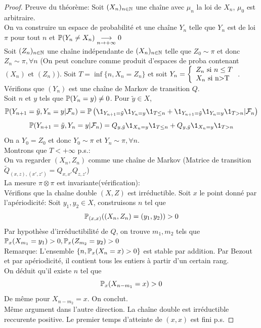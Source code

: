 \documentclass[]{report}
\begin{document}
    \begin{proof}
        Preuve du théorème: Soit $(X_n)_{n\in\mathbb{N}}$ une chaîne avec $\mu_n$ la loi de $X_n$, $\mu_0$ est arbitraire.\\
        On va construire un espace de probabilité et une chaîne $Y_n$ telle que $Y_n$ est de loi $\pi$ pour tout $n$ et $\mathbb{P}(Y_n\neq X_n)\underset{n\to +\infty}{\longrightarrow} 0$\\
        Soit $(Z_n)_{n\in\mathbb{N}}$ une chaîne indépendante de $(X_n)_{n\in\mathbb{N}}$ telle que $Z_0\sim \pi$ et donc $Z_n\sim \pi,\forall n$ (On peut conclure comme produit d'espaces de proba contenant $(X_n)$ et $(Z_n)$). Soit $T=\inf\{n,X_n=Z_n\}$ et soit $Y_n=\left\{\begin{array}{ll} Z_n\text{ si $n\le T$}\\ X_n\text{ si n>T} \end{array} \right.$. Vérifions que $(Y_n)$ est une chaîne de Markov de transition $Q$.\\
        Soit $n$ et $y$ tels que $\mathbb{P}(Y_n=y)\neq 0$. Pour $\tilde{y}\in X$,
        \[\Pa(Y_{n+1}=\tilde{y},Y_n=y|\Fr_n)=\Pa\left(\1_{Y_{n+1}=\tilde{y}}\1_{Y_n=y}\1_{T\le n}+\1_{Y_{n+1}=\tilde{y}}\1_{Y_n=y}\1_{T>n}|\Fr_n \right)\]
        \[\Pa(Y_{n+1}=\tilde{y},Y_n=y|\Fr_n)=Q_{y,\tilde{y}}\1_{X_n=y}\1_{T\le n}+Q_{y,\tilde{y}}\1_{X_n=y}\1_{T>n}\]
        On a $Y_0=Z_0$ et donc $Y_0\sim \pi$ et $Y_n\sim \pi,\forall n$.\\
        Montrons que $T<+\infty$ p.s.:\\
        On va regarder $(X_n,Z_n)$ comme une chaîne de Markov (Matrice de transition $\tilde{Q}_{(x,z),(x',z')}=Q_{x,x'}Q_{z,z'}$)\\
        La mesure $\pi \otimes \pi$ est invariante(vérification):\\
        Vérifions que la chaîne double $(X,Z)$ est irréductible. Soit $x$ le point donné par l'apériodicité: Soit $y_1,y_2\in X$, construisons $n$ tel que
        \[\mathbb{P}_{(x,x)}((X_n,Z_n)=(y_1,y_2))>0\]
        Par hypothèse d'irréductibilité de $Q$, on trouve $m_1,m_2$ tels que $\mathbb{P}_x(X_{m_1}=y_1)>0,\mathbb{P}_x(Z_{m_2}=y_2)>0$\\
        Remarque: L'ensemble $\{n,\mathbb{P}_x(X_n=x)>0\}$ est stable par addition. 
        Par Bezout et par apériodicité, il contient tous les entiers à partir d'un certain rang.\\
        On déduit qu'il existe $n$ tel que 
        \[\mathbb{P}_x(X_{n-m_1}=x)>0\]
        De même pour $X_{n-m_2}=x$. On conclut.\\
        Même argument dans l'autre direction.
        La chaîne double est irréductible reccurente positive. Le premier temps d'atteinte de $(x,x)$ est fini p.s.
    \end{proof}
\end{document}
